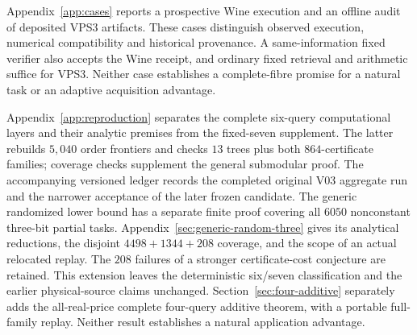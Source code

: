 \documentclass[pdflatex,sn-mathphys-num]{sn-jnl}
\theoremstyle{thmstyleone}
\theoremstyle{thmstylethree}
\theoremstyle{thmstyletwo}
\begin{document}
Appendix~\ref{app:cases} reports a prospective Wine execution and an offline audit of deposited VPS3 artifacts. These cases distinguish observed execution, numerical compatibility and historical provenance. A same-information fixed verifier also accepts the Wine receipt, and ordinary fixed retrieval and arithmetic suffice for VPS3. Neither case establishes a complete-fibre promise for a natural task or an adaptive acquisition advantage.

Appendix~\ref{app:reproduction} separates the complete six-query computational layers and their analytic premises from the fixed-seven supplement. The latter rebuilds $5,040$ order frontiers and checks $13$ trees plus both $864$-certificate families; coverage checks supplement the general submodular proof. The accompanying versioned ledger records the completed original V03 aggregate run and the narrower acceptance of the later frozen candidate.
The generic randomized lower bound has a separate finite proof covering all $6050$ nonconstant three-bit partial tasks. Appendix~\ref{sec:generic-random-three} gives its analytical reductions, the disjoint $4498+1344+208$ coverage, and the scope of an actual relocated replay. The $208$ failures of a stronger certificate-cost conjecture are retained. This extension leaves the deterministic six/seven classification and the earlier physical-source claims unchanged. Section~\ref{sec:four-additive} separately adds the all-real-price complete four-query additive theorem, with a portable full-family replay. Neither result establishes a natural application advantage.
\end{document}
